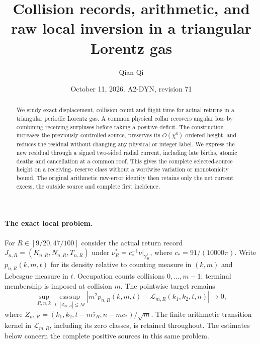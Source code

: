 \documentclass[11pt,reqno]{amsart}
\title[Collision records and raw local inversion]{Collision records, arithmetic, and raw local inversion in a triangular Lorentz gas}
\author{Qian Qi}
\date{October 11, 2026. A2-DYN, revision 71}
\numberwithin{equation}{section}
\theoremstyle{definition}\newtheorem{definition}[theorem]{Definition}
\theoremstyle{remark}\newtheorem{remark}[theorem]{Remark}
\begin{document}
\raggedbottom
\begin{abstract}
We study exact displacement, collision count and flight time for
actual returns in a triangular periodic Lorentz gas. A common physical
collar recovers angular loss by combining receiving surpluses before
taking a positive deficit. The construction increases the previously
controlled source, preserves its $O(\chi^6)$ ordered height, and
reduces the residual without changing any physical or integer label.
We express the new residual through a signed two-sided radial current,
including late births, atomic deaths and cancellation at a common
roof. This gives the complete selected-source height on a receiving-
reserve class without a wordwise variation or monotonicity bound.
The original arithmetic raw-error identity then retains only the net
current excess, the outside source and complete first incidence.
\end{abstract}
\maketitle

\paragraph{The exact local problem.}
For $R\in[9/20,47/100]$ consider the actual return record
$J_{n,R}=(K_{n,R},N_{n,R},T_{n,R})$ under
$\nu_R^*=c_*^{-1}\nu|_{Y_R^*}$, where $c_*=91/(10000\pi)$.
Write $p_{n,R}(k,m,t)$ for its density relative to counting measure
in $(k,m)$ and Lebesgue measure in $t$. Occupation counts collisions
$0,\ldots,m-1$; terminal membership is imposed at collision $m$.
The pointwise target remains
\begin{equation}\label{eq:intro-v71-target}
 \sup_{R,n,k}\operatorname*{ess\,sup}_{t:\,|Z_{m,R}|\le M}
 \left|m^2p_{n,R}(k,m,t)-\mathcal L_{m,R}(k_1,k_2,t,n)\right|
 \longrightarrow0,
\end{equation}
where $Z_{m,R}=(k_1,k_2,t-m\bar\tau_R,n-mc_*)/\sqrt m$.
The finite arithmetic transition kernel in $\mathcal L_{m,R}$,
including its zero classes, is retained throughout. The estimates
below concern the complete positive sources in this same problem.
\end{document}
